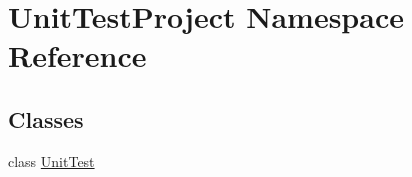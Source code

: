 \hypertarget{namespace_unit_test_project}{}\section{Unit\+Test\+Project Namespace Reference}
\label{namespace_unit_test_project}
\subsection*{Classes}
\begin{DoxyCompactItemize}
\item 
class \hyperlink{class_unit_test_project_1_1_unit_test}{Unit\+Test}
\end{DoxyCompactItemize}
